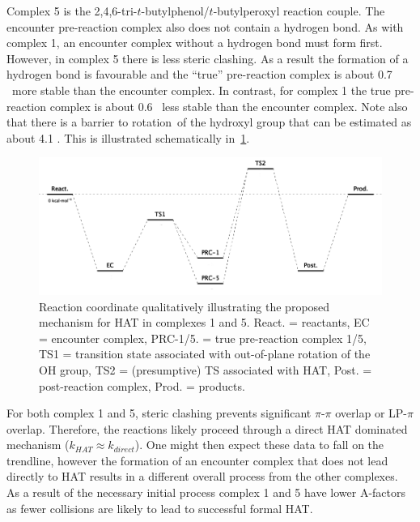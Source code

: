 \begin{doublespace}
Complex 5 is the 2,4,6-tri-$t$-butylphenol/$t$-butylperoxyl reaction couple. The
encounter pre-reaction complex also does not contain a hydrogen bond. As with
complex 1, an encounter complex without a hydrogen bond must form
first. However, in complex 5 there is less steric clashing. As a result the
formation of a hydrogen bond is favourable and the ``true'' pre-reaction complex
is about 0.7 \kcalmol\ more stable than the encounter complex. In contrast, for
complex 1 the true pre-reaction complex is about 0.6 \kcalmol\ less stable than
the encounter complex. Note also that there is a barrier to
rotation\footnotemark\ of the hydroxyl group that can be estimated as about 4.1
\kcalmol. This is illustrated schematically in~\ref{fig:encounter-pes}.


\begin{figure}[!htbp]
  \centering
  \includegraphics[width=\textwidth]{figures/encounter-pes.png}
  \caption[Reaction coordinate qualitatively illustrating the proposed mechanism for HAT in
  complexes 1 and 5.]{Reaction coordinate qualitatively illustrating the proposed mechanism for
  HAT in complexes 1 and 5. React. = reactants, EC = encounter complex,
  PRC-1/5. = true pre-reaction complex 1/5, TS1 = transition state associated
  with out-of-plane rotation of the OH group, TS2 = (presumptive) TS associated
  with HAT, Post. = post-reaction complex, Prod. = products.}
  \label{fig:encounter-pes}
\end{figure}

For both complex 1 and 5, steric clashing prevents significant $\pi$-$\pi$
overlap or LP-$\pi$ overlap. Therefore, the reactions likely proceed through a
direct HAT dominated mechanism ($k_{HAT} \approx k_{direct}$). One might then
expect these data to fall on the trendline, however the formation of an
encounter complex that does not lead directly to HAT results in a different
overall process from the other complexes. As a result of the necessary initial
process complex 1 and 5 have lower A-factors as fewer collisions are likely to
lead to successful formal HAT.



\end{doublespace}
